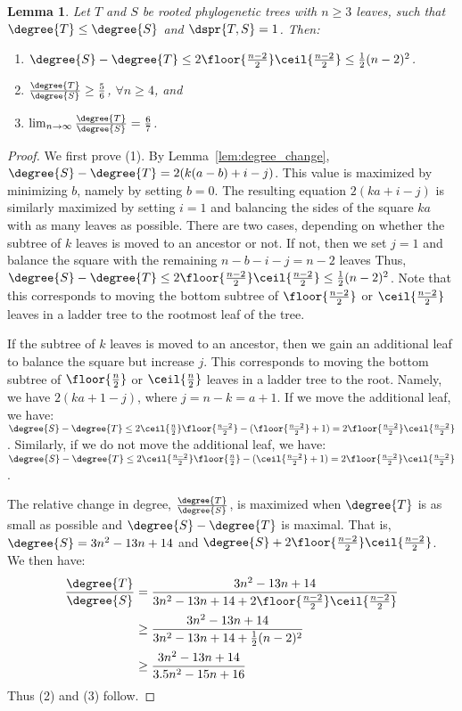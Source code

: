 \documentclass{amsart}
\newtheorem{lemma}[theorem]{Lemma}
\begin{document}
\begin{lemma}
	\label{lem:degree_max_delta_adjacent}
	Let $T$ and $S$ be rooted phylogenetic trees with $n \ge 3$ leaves, such that $\degree{T} \le \degree{S}$ and $\dspr{T,S} = 1$.
	Then:
	\begin{enumerate}
		\item $\degree{S} - \degree{T} \le 2\floor{\frac{n-2}{2}}\ceil{\frac{n-2}{2}} \le \frac{1}{2} (n-2)^2 $.
		\item $\frac{\degree{T}}{\degree{S}} \ge \frac{5}{6}$, $\forall n \ge 4$, and
		\item $\lim_{n\rightarrow\infty}\frac{\degree{T}}{\degree{S}} =  \frac{6}{7}$.
	\end{enumerate}
\end{lemma}
\begin{proof}
	We first prove (1).
	By Lemma~\ref{lem:degree_change}, $\degree{S} - \degree{T} = 2(k(a-b) + i - j)$.
	This value is maximized by minimizing $b$, namely by setting $b=0$.
	The resulting equation $2(ka + i - j)$ is similarly maximized by setting $i=1$ and balancing the sides of the square $ka$ with as many leaves as possible.
	There are two cases, depending on whether the subtree of $k$ leaves is moved to an ancestor or not. If not, then we set $j=1$ and balance the square with the remaining $n-b-i-j = n-2$ leaves
	Thus, $\degree{S} - \degree{T} \le 2\floor{\frac{n-2}{2}}\ceil{\frac{n-2}{2}} \le \frac{1}{2} (n-2)^2 $.
	Note that this corresponds to moving the bottom subtree of $\floor{\frac{n-2}{2}}$ or $\ceil{\frac{n-2}{2}}$ leaves in a ladder tree to the rootmost leaf of the tree.

	If the subtree of $k$ leaves is moved to an ancestor, then we gain an additional leaf to balance the square but increase $j$.
	This corresponds to moving the bottom subtree of $\floor{\frac{n}{2}}$ or $\ceil{\frac{n}{2}}$ leaves in a ladder tree to the root.
	Namely, we have $2(ka + 1 - j)$, where $j = n - k = a + 1$.
	If we move the additional leaf, we have:
$\degree{S} - \degree{T} \le 2\ceil{\frac{n}{2}}\floor{\frac{n-2}{2}} -  (\floor{\frac{n-2}{2}} + 1) = 2\floor{\frac{n-2}{2}}\ceil{\frac{n-2}{2}}$.
Similarly, if we do not move the additional leaf, we have:
$\degree{S} - \degree{T} \le 2\ceil{\frac{n-2}{2}}\floor{\frac{n}{2}} -  (\ceil{\frac{n-2}{2}} + 1) = 2\floor{\frac{n-2}{2}}\ceil{\frac{n-2}{2}}$.

	The relative change in degree, $\frac{\degree{T}}{\degree{S}}$, is maximized when $\degree{T}$ is as small as possible and $\degree{S} - \degree{T}$ is maximal.
	That is, $\degree{S} = 3n^2 - 13n + 14$ and $\degree{S} + 2\floor{\frac{n-2}{2}} \ceil{\frac{n-2}{2}}$.
	We then have:
	\begin{align}
		\frac{\degree{T}}{\degree{S}} &= \frac{3n^2 - 13n + 14}{3n^2 - 13n + 14 + 2\floor{\frac{n-2}{2}} \ceil{\frac{n-2}{2}}} \\
		&\ge \frac{3n^2 - 13n + 14}{3n^2 - 13n + 14 + \frac{1}{2}(n-2)^2} \\
		&\ge \frac{3n^2 - 13n + 14}{3.5n^2 - 15n + 16}
	\end{align}
	Thus (2) and (3) follow.

\end{proof}
\end{document}
